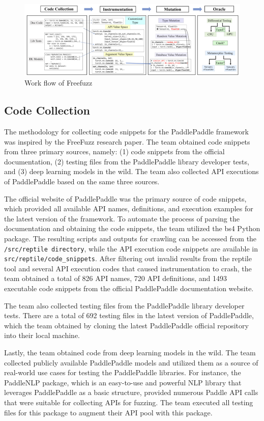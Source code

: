 \documentclass[sigconf]{acmart}
\begin{document}
  \begin{figure}[h]
    \centering
    \includegraphics[width=\linewidth]{1.png}
    \caption{Work flow of Freefuzz}
  \end{figure}
  \subsection{Code Collection}
  \par The methodology for collecting code snippets for the PaddlePaddle framework was inspired by the FreeFuzz research paper. The team obtained code snippets from three primary sources, namely: (1) code snippets from the official documentation, (2) testing files from the PaddlePaddle library developer tests, and (3) deep learning models in the wild. The team also collected API executions of PaddlePaddle based on the same three sources.
  \par The official website of PaddlePaddle was the primary source of code snippets, which provided all available API names, definitions, and execution examples for the latest version of the framework. To automate the process of parsing the documentation and obtaining the code snippets, the team utilized the bs4 Python package. The resulting scripts and outputs for crawling can be accessed from the \verb|/src/reptile directory|, while the API execution code snippets are available in \verb|src/reptile/code_snippets|. After filtering out invalid results from the reptile tool and several API execution codes that caused instrumentation to crash, the team obtained a total of 826 API names, 720 API definitions, and 1493 executable code snippets from the official PaddlePaddle documentation website.
  \par The team also collected testing files from the PaddlePaddle library developer tests. There are a total of 692 testing files in the latest version of PaddlePaddle, which the team obtained by cloning the latest PaddlePaddle official repository into their local machine.
  \par Lastly, the team obtained code from deep learning models in the wild. The team collected publicly available PaddlePaddle models and utilized them as a source of real-world use cases for testing the PaddlePaddle libraries. For instance, the PaddleNLP package, which is an easy-to-use and powerful NLP library that leverages PaddlePaddle as a basic structure, provided numerous Paddle API calls that were suitable for collecting APIs for fuzzing. The team executed all testing files for this package to augment their API pool with this package.
  
\end{document}
